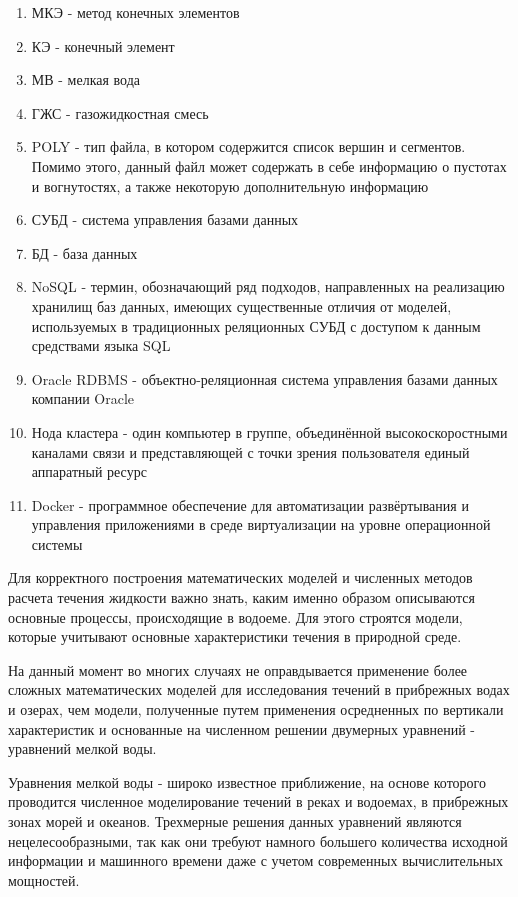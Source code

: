 \documentclass[14pt]{extreport}
\begin{document}


\tableofcontents

\abbrevdef

\begin{enumerate}
\item МКЭ - метод конечных элементов
\item КЭ - конечный элемент
\item МВ - мелкая вода
\item ГЖС - газожидкостная смесь
\item POLY - тип файла, в котором содержится список вершин и сегментов. Помимо этого, данный файл может содержать в себе информацию о пустотах и вогнутостях, а также некоторую дополнительную информацию\cite{bib:website:quake:triangle}
\item СУБД - система управления базами данных
\item БД - база данных
\item NoSQL - термин, обозначающий ряд подходов, направленных на реализацию хранилищ баз данных, имеющих существенные отличия от моделей, используемых в традиционных реляционных СУБД с доступом к данным средствами языка SQL
\item Oracle RDBMS - объектно-реляционная система управления базами данных компании Oracle
\item Нода кластера - один компьютер в группе, объединённой высокоскоростными каналами связи и представляющей с точки зрения пользователя единый аппаратный ресурс
\item Docker - программное обеспечение для автоматизации развёртывания и управления приложениями в среде виртуализации на уровне операционной системы
\end{enumerate}

\intro

Для корректного построения математических моделей и численных методов расчета течения жидкости важно знать, каким именно образом описываются основные процессы, происходящие в водоеме. Для этого строятся модели, которые учитывают основные характеристики течения в природной среде.

На данный момент во многих случаях не оправдывается применение более сложных математических моделей для исследования течений в прибрежных водах и озерах, чем модели, полученные путем применения осредненных по вертикали характеристик и основанные на численном решении двумерных уравнений - уравнений мелкой воды.

Уравнения мелкой воды - широко известное приближение, на основе которого проводится численное моделирование течений в реках и водоемах, в прибрежных зонах морей и океанов. Трехмерные решения данных уравнений являются нецелесообразными, так как они требуют намного большего количества исходной информации и машинного времени даже с учетом современных вычислительных мощностей.
\end{document}
